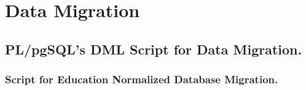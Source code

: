 \chapter{Data Migration} 
\label{AppendixP} 


\section{PL/pgSQL's DML Script for Data Migration.}

\subsection{Script for Education Normalized Database Migration.}

